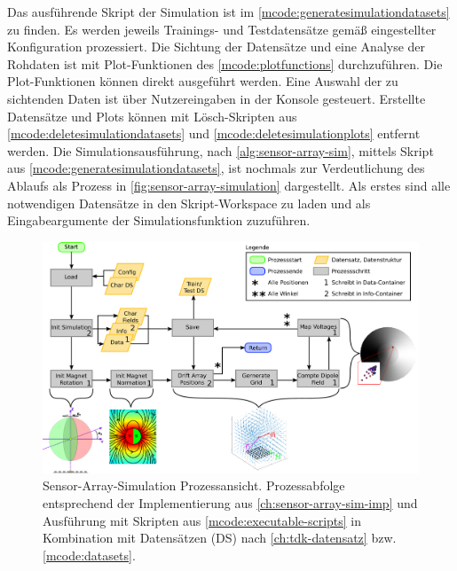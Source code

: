\clearpage


Das ausführende Skript der Simulation ist im \autoref{mcode:generatesimulationdatasets} zu finden. Es werden jeweils Trainings- und Testdatensätze gemäß eingestellter Konfiguration prozessiert. Die Sichtung der Datensätze und eine Analyse der Rohdaten ist mit Plot-Funktionen des \autoref{mcode:plotfunctions} durchzuführen. Die Plot-Funktionen können direkt ausgeführt werden. Eine Auswahl der zu sichtenden Daten ist über Nutzereingaben in der Konsole gesteuert. Erstellte Datensätze und Plots können mit Lösch-Skripten aus \autoref{mcode:deletesimulationdatasets} und \autoref{mcode:deletesimulationplots} entfernt werden.
\newline
Die Simulationsausführung, nach \autoref{alg:sensor-array-sim}, mittels Skript aus \autoref{mcode:generatesimulationdatasets}, ist nochmals zur Verdeutlichung des Ablaufs als Prozess in \autoref{fig:sensor-array-simulation} dargestellt. Als erstes sind alle notwendigen Datensätze in den Skript-Workspace zu laden und als Eingabeargumente der Simulationsfunktion zuzuführen. 


\vspace{5mm}
\begin{figure}[bph]
	\centering
	\includegraphics[width=\linewidth]{chapters/images/3-SW-E-OExp/Sensor-Array-Simulation}
	\caption[Sensor-Array-Simulation Prozessansicht]{Sensor-Array-Simulation Prozessansicht. Prozessabfolge entsprechend der Implementierung aus \autoref{ch:sensor-array-sim-imp} und Ausführung mit Skripten aus \autoref{mcode:executable-scripts} in Kombination mit Datensätzen (DS) nach \autoref{ch:tdk-datensatz} bzw. \autoref{mcode:datasets}.}
	\label{fig:sensor-array-simulation}
\end{figure}


